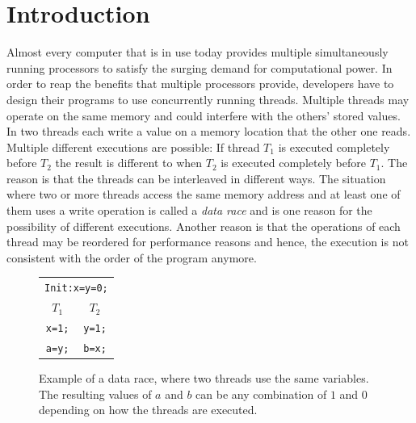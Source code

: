\documentclass[a4paper,twoside,12pt, english]{article}
\begin{document}
\section{Introduction}\label{sec:intro}
Almost every computer that is in use today provides multiple simultaneously running processors to satisfy the surging demand for computational power. In order to reap the benefits that multiple processors provide, developers have to design their programs to use concurrently running threads. 
Multiple threads may operate on the same memory and could interfere with the others' stored values. In  two threads each write a value on a memory location that the other one reads. 
Multiple different executions are possible: If thread $T_1$ is executed completely before $T_2$ the result is different to when $T_2$ is executed completely before $T_1$. The reason is that the threads can be interleaved in different ways. The situation where two or more threads access the same memory address and at least one of them uses a write operation is called a \textit{data race} and is one reason for the possibility of different executions. Another reason is that the operations of each thread may be reordered for performance reasons and hence, the execution is not consistent with the order of the program anymore. \\

\begin{figure}[h]
\centering
\begin{tabular}{c||c}
\multicolumn{2}{c}{\texttt{Init:x=y=0;}} \\[2mm]
 $T_1$ & $T_2$ \\[2mm]

\texttt{x=1;} & \texttt{y=1;} \\
\texttt{a=y;} & \texttt{b=x;} \\
\end{tabular}
\caption{Example of a data race, where two threads use the same variables. The resulting values of $a$ and $b$ can be any combination of $1$ and $0$ depending on how the threads are executed.}
\label{fig:example}
\end{figure}
\end{document}
